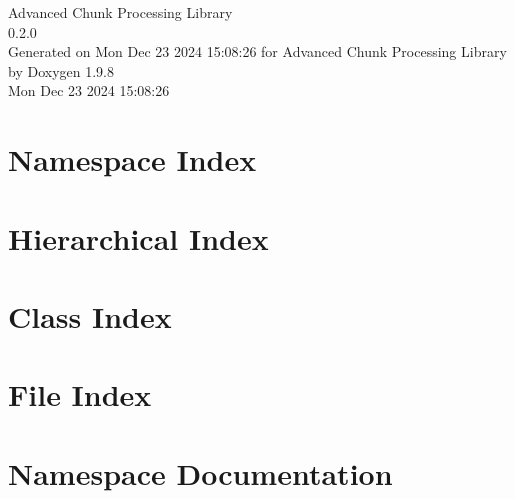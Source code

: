 \documentclass[twoside]{book}
\newcommand{\+}{\discretionary{\mbox{\scriptsize$\hookleftarrow$}}{}{}}
\newcommand{\clearemptydoublepage}{%
    \newpage{\pagestyle{empty}\cleardoublepage}%
  }
\begin{document}
  \raggedbottom
    \hypersetup{pageanchor=false,
                bookmarksnumbered=true,
                pdfencoding=unicode
               }
  \begin{titlepage}
  \vspace*{7cm}
  \begin{center}%
  {\Large Advanced Chunk Processing Library}\\
  [1ex]\large 0.\+2.\+0 \\
  \vspace*{1cm}
  {\large Generated on Mon Dec 23 2024 15\+:08\+:26 for Advanced Chunk Processing Library by Doxygen 1.9.8}\\
    \vspace*{0.5cm}
    {\small Mon Dec 23 2024 15:08:26}
  \end{center}
  \end{titlepage}
  \clearemptydoublepage
  \tableofcontents
  \clearemptydoublepage
  \hypersetup{pageanchor=true}


\chapter{Namespace Index}

\chapter{Hierarchical Index}

\chapter{Class Index}

\chapter{File Index}

\chapter{Namespace Documentation}















\end{document}
